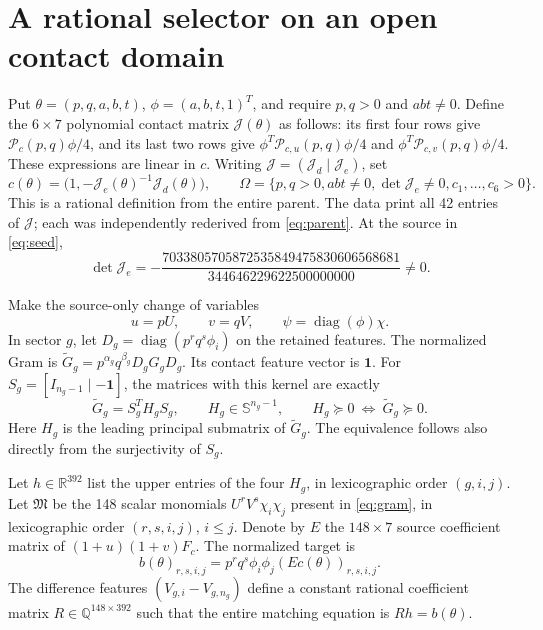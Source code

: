 \documentclass[11pt]{article}
\newcommand{\R}{\mathbb R}
\newcommand{\Q}{\mathbb Q}
\newcommand{\one}{\mathbf 1}
\DeclareMathOperator{\diag}{diag}
\begin{document}
\section{A rational selector on an open contact domain}

Put $\theta=(p,q,a,b,t)$, $\phi=(a,b,t,1)^T$, and require
$p,q>0$ and $abt\ne0$.
Define the $6\times7$ polynomial contact matrix $\mathcal J(\theta)$
as follows: its first four rows give $\mathcal P_c(p,q)\phi/4$, and
its last two rows give
$\phi^T\mathcal P_{c,u}(p,q)\phi/4$ and
$\phi^T\mathcal P_{c,v}(p,q)\phi/4$.
These expressions are linear in $c$.
Writing $\mathcal J=(\mathcal J_d\mid\mathcal J_e)$, set
\begin{equation}
 c(\theta)=\bigl(1,-\mathcal J_e(\theta)^{-1}
                         \mathcal J_d(\theta)\bigr),
 \qquad
 \Omega=\{p,q>0, abt\ne0, \det\mathcal J_e\ne0,
                          c_1,\ldots,c_6>0\}.
 \label{eq:sourcechart}
\end{equation}
This is a rational definition from the entire parent.  The data print
all 42 entries of $\mathcal J$; each was independently rederived from
\eqref{eq:parent}.  At the source in \eqref{eq:seed},
\begin{equation}
 \det\mathcal J_e
   =-\frac{7033805705872535849475830606568681}
                  {344646229622500000000}\ne0.
 \label{eq:minor}
\end{equation}

Make the source-only change of variables
\begin{equation}
 u=pU,\qquad v=qV,\qquad \psi=\diag(\phi)\chi.
 \label{eq:normalize}
\end{equation}
In sector $g$, let $D_g=\diag(p^rq^s\phi_i)$ on the retained features.
The normalized Gram is
$\widetilde G_g=p^{\alpha_g}q^{\beta_g}D_gG_gD_g$.
Its contact feature vector is $\one$.
For $S_g=[I_{n_g-1}\mid-\one]$, the matrices with this kernel are exactly
\begin{equation}
 \widetilde G_g=S_g^TH_gS_g,
 \qquad H_g\in\mathbb S^{n_g-1},
 \qquad H_g\succeq0\ \Longleftrightarrow\
                              \widetilde G_g\succeq0.
 \label{eq:compress}
\end{equation}
Here $H_g$ is the leading principal submatrix of $\widetilde G_g$.
The equivalence follows also directly from the surjectivity of $S_g$.

Let $h\in\R^{392}$ list the upper entries of the four $H_g$, in
lexicographic order $(g,i,j)$.  Let $\mathfrak M$ be the 148 scalar
monomials $U^rV^s\chi_i\chi_j$ present in \eqref{eq:gram}, in
lexicographic order $(r,s,i,j)$, $i\leq j$.
Denote by $E$ the $148\times7$ source coefficient matrix of
$(1+u)(1+v)F_c$.  The normalized target is
\begin{equation}
 b(\theta)_{r,s,i,j}
     =p^rq^s\phi_i\phi_j(Ec(\theta))_{r,s,i,j}.
 \label{eq:b}
\end{equation}
The difference features $(V_{g,i}-V_{g,n_g})$ define a constant rational
coefficient matrix $R\in\Q^{148\times392}$ such that the entire matching
equation is $Rh=b(\theta)$.
\end{document}
